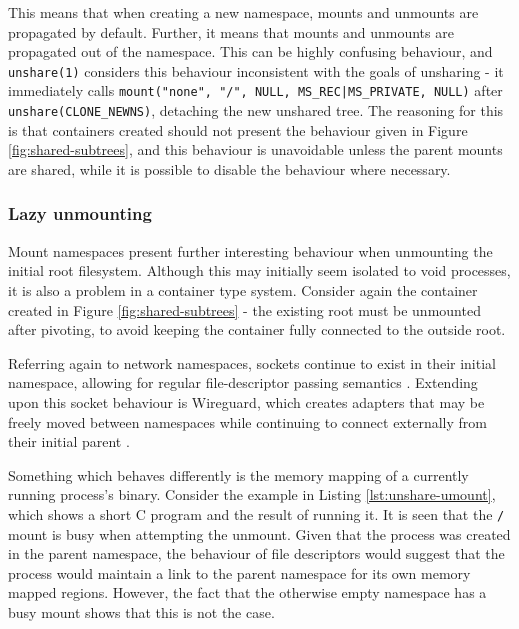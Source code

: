 \documentclass[sigplan]{acmart}
\begin{document}

This means that when creating a new namespace, mounts and unmounts are propagated by default. Further, it means that mounts and unmounts are propagated out of the namespace. This can be highly confusing behaviour, and \texttt{unshare(1)} considers this behaviour inconsistent with the goals of unsharing - it immediately calls \texttt{mount("none", "/", NULL, MS\_REC|MS\_PRIVATE, NULL)} after \texttt{unshare(CLONE\_NEWNS)}, detaching the new unshared tree. The reasoning for this is that containers created should not present the behaviour given in Figure \ref{fig:shared-subtrees}, and this behaviour is unavoidable unless the parent mounts are shared, while it is possible to disable the behaviour where necessary.

\subsubsection{Lazy unmounting}

Mount namespaces present further interesting behaviour when unmounting the initial root filesystem. Although this may initially seem isolated to void processes, it is also a problem in a container type system. Consider again the container created in Figure \ref{fig:shared-subtrees} - the existing root must be unmounted after pivoting, to avoid keeping the container fully connected to the outside root.

Referring again to network namespaces, sockets continue to exist in their initial namespace, allowing for regular file-descriptor passing semantics \citep{biederman_re_2007}. Extending upon this socket behaviour is Wireguard, which creates adapters that may be freely moved between namespaces while continuing to connect externally from their initial parent \citep[§7.3]{donenfeld_wireguard_2017}.

Something which behaves differently is the memory mapping of a currently running process's binary. Consider the example in Listing \ref{lst:unshare-umount}, which shows a short C program and the result of running it. It is seen that the \texttt{/} mount is busy when attempting the unmount. Given that the process was created in the parent namespace, the behaviour of file descriptors would suggest that the process would maintain a link to the parent namespace for its own memory mapped regions. However, the fact that the otherwise empty namespace has a busy mount shows that this is not the case.
\end{document}
